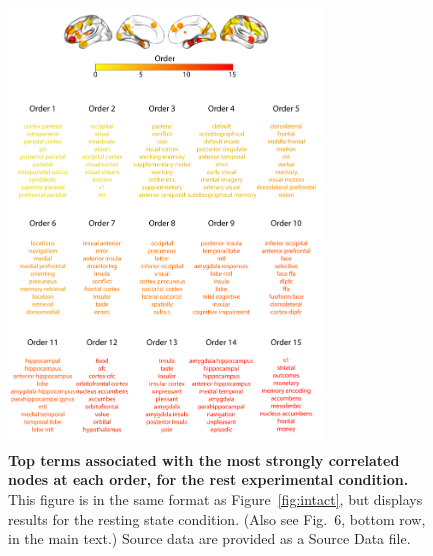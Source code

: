 \documentclass[english]{article}
\newcommand{\neurosynth}{6}
\begin{document}
\begin{figure}[p!]
\centering
\includegraphics[width=0.75\textwidth]{figs/supp_15_rest}
\caption{\textbf{Top terms associated with the most strongly
      correlated nodes at each order, for the rest experimental
    condition.}  This figure is in the same format as
  Figure~\ref{fig:intact}, but displays results for the
  resting state condition.  (Also see Fig.~\neurosynth,
bottom row, in the main text.) Source data are provided as a Source Data file.}
\label{fig:rest}
\end{figure}
\end{document}
